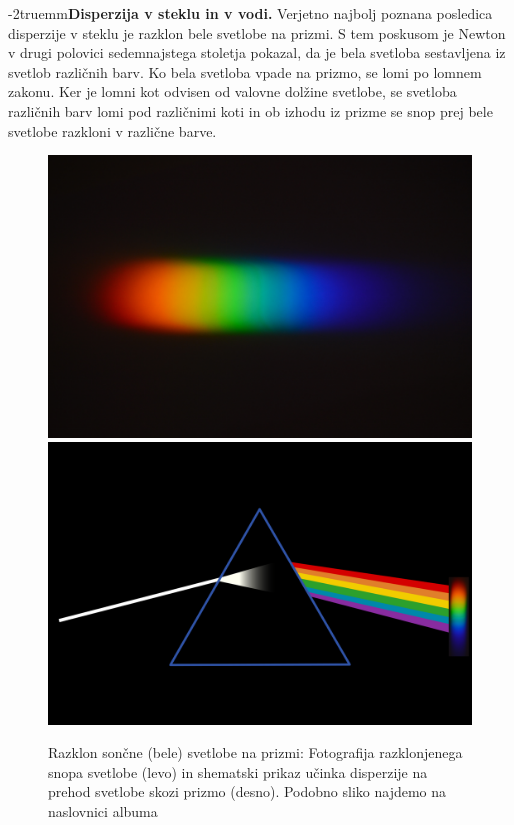 \begin{example}
\vglue-2truemm{\bf Disperzija v steklu in v vodi.}
Verjetno najbolj poznana posledica disperzije v steklu je razklon bele svetlobe
na prizmi. S tem poskusom je Newton v drugi polovici sedemnajstega stoletja
pokazal, da je bela svetloba sestavljena iz svetlob različnih barv. Ko bela
svetloba vpade na prizmo, se lomi po lomnem zakonu. Ker je lomni kot odvisen
od valovne dolžine svetlobe, se svetloba različnih barv lomi pod različnimi
koti in ob izhodu iz prizme se snop prej bele svetlobe razkloni v različne
barve.
\begin{figure}[ht]
\centering
\includegraphics[width=7truecm]{slike/09_prizma.jpg}\hfill
\includegraphics[width=7truecm]{slike/09_prizma_disp.png}
\caption{Razklon sončne (bele) svetlobe na prizmi: Fotografija razklonjenega
snopa svetlobe (levo) in shematski prikaz učinka disperzije na prehod svetlobe
skozi prizmo (desno). Podobno sliko najdemo na naslovnici albuma 
}
\end{figure}
\end{example}
